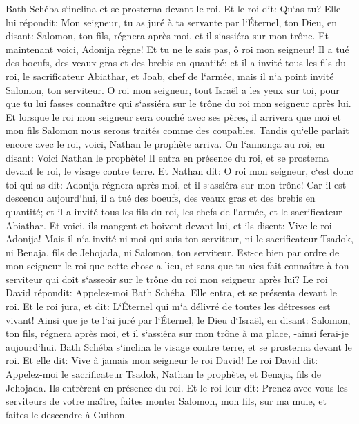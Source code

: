 \verse Bath Schéba s`inclina et se prosterna devant le roi. Et le roi dit: Qu`as-tu? 
\verse Elle lui répondit: Mon seigneur, tu as juré à ta servante par l`Éternel, ton Dieu, en disant: Salomon, ton fils, régnera après moi, et il s`assiéra sur mon trône. 
\verse Et maintenant voici, Adonija règne! Et tu ne le sais pas, ô roi mon seigneur! 
\verse Il a tué des boeufs, des veaux gras et des brebis en quantité; et il a invité tous les fils du roi, le sacrificateur Abiathar, et Joab, chef de l`armée, mais il n`a point invité Salomon, ton serviteur. 
\verse O roi mon seigneur, tout Israël a les yeux sur toi, pour que tu lui fasses connaître qui s`assiéra sur le trône du roi mon seigneur après lui. 
\verse Et lorsque le roi mon seigneur sera couché avec ses pères, il arrivera que moi et mon fils Salomon nous serons traités comme des coupables. 
\verse Tandis qu`elle parlait encore avec le roi, voici, Nathan le prophète arriva. 
\verse On l`annonça au roi, en disant: Voici Nathan le prophète! Il entra en présence du roi, et se prosterna devant le roi, le visage contre terre. 
\verse Et Nathan dit: O roi mon seigneur, c`est donc toi qui as dit: Adonija régnera après moi, et il s`assiéra sur mon trône! 
\verse Car il est descendu aujourd`hui, il a tué des boeufs, des veaux gras et des brebis en quantité; et il a invité tous les fils du roi, les chefs de l`armée, et le sacrificateur Abiathar. Et voici, ils mangent et boivent devant lui, et ils disent: Vive le roi Adonija! 
\verse Mais il n`a invité ni moi qui suis ton serviteur, ni le sacrificateur Tsadok, ni Benaja, fils de Jehojada, ni Salomon, ton serviteur. 
\verse Est-ce bien par ordre de mon seigneur le roi que cette chose a lieu, et sans que tu aies fait connaître à ton serviteur qui doit s`asseoir sur le trône du roi mon seigneur après lui? 
\verse Le roi David répondit: Appelez-moi Bath Schéba. Elle entra, et se présenta devant le roi. 
\verse Et le roi jura, et dit: L`Éternel qui m`a délivré de toutes les détresses est vivant! 
\verse Ainsi que je te l`ai juré par l`Éternel, le Dieu d`Israël, en disant: Salomon, ton fils, régnera après moi, et il s`assiéra sur mon trône à ma place, -ainsi ferai-je aujourd`hui. 
\verse Bath Schéba s`inclina le visage contre terre, et se prosterna devant le roi. Et elle dit: Vive à jamais mon seigneur le roi David! 
\verse Le roi David dit: Appelez-moi le sacrificateur Tsadok, Nathan le prophète, et Benaja, fils de Jehojada. Ils entrèrent en présence du roi. 
\verse Et le roi leur dit: Prenez avec vous les serviteurs de votre maître, faites monter Salomon, mon fils, sur ma mule, et faites-le descendre à Guihon. 
